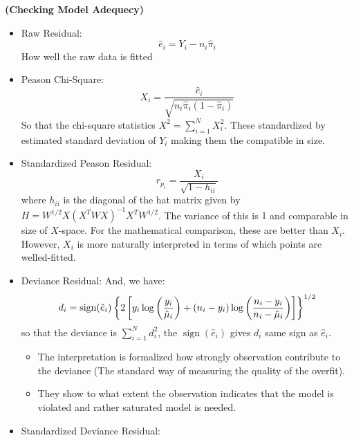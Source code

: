 \begin{remark}{\textbf{(Checking Model Adequecy)}}
   \begin{itemize}
       \item Raw Residual: 
       \begin{equation*} 
           \hat{e}_i = Y_i - n_i\hat{\pi}_i
       \end{equation*}
        How well the raw data is fitted
       \item Peason Chi-Square: 
       \begin{equation*}
           X_i = \frac{\hat{e}_i}{\sqrt{n_i\hat{\pi}_i(1-\hat{\pi}_i)}}
       \end{equation*}
       So that the chi-square statistics $X^2 = \sum^N_{i=1}X_i^2$. These standardized by estimated standard deviation of $Y_i$ making them the compatible in size. 
       \item Standardized Peason Residual: 
       \begin{equation*}
           r_{p_i} = \frac{X_i}{\sqrt{1-h_{ii}}}
       \end{equation*}
       where $h_{ii}$ is the diagonal of the hat matrix given by $H = W^{1/2}X(X^TWX)^{-1}X^TW^{1/2}$. The variance of this is $1$ and comparable in size of $X$-space. For the mathematical comparison, these are better than $X_i$. However, $X_i$ is more naturally interpreted in terms of which points are welled-fitted. 
       \item Deviance Residual: And, we have:
       \begin{equation*}
           d_i = \operatorname{sign}(\hat{e}_i)\left\{ 2\left[ y_i\log\left( \frac{y_i}{\hat{\mu}_i} \right) + (n_i-y_i)\log\left( \frac{n_i - y_i}{n_i - \hat{\mu}_i} \right)  \right] \right\}^{1/2}
       \end{equation*}
       so that the deviance is $\sum^N_{i=1}d_i^2$, the $\operatorname{sign}(\hat{e}_i)$ gives $d_i$ same sign as $\hat{e}_i$. 
       \begin{itemize}
           \item The interpretation is formalized how strongly observation contribute to the deviance (The standard way of measuring the quality of the overfit). 
           \item They show to what extent the observation indicates that the model is violated and rather saturated model is needed.
       \end{itemize}
       \item Standardized Deviance Residual: 
       \begin{equation*}

\end{equation*}
\end{itemize}
\end{remark}
